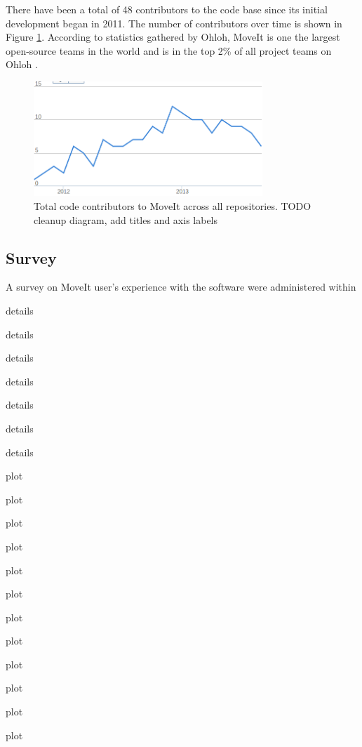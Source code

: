 \documentclass[10pt,journal,compsoc]{joser1}
\begin{document}
{There have been a total of 48 contributors to the code base since its initial development began in 2011. The number of contributors over time is shown in Figure \ref{fig:contributors}. According to statistics gathered by Ohloh, MoveIt is one the largest open-source teams in the world and is in the top 2\% of all project teams on Ohloh \cite{ohloh}.

\begin{figure}[!t]
\centering
\includegraphics[width=3.4in]{images/contributors}
\caption{Total code contributors to MoveIt across all repositories. TODO cleanup diagram, add titles and axis labels}
\label{fig:contributors}
\end{figure}


\subsection{Survey}
\label{sec::survey}

A survey on MoveIt user's experience with the software were administered within

details

details

details

details

details

details

details

plot 

plot 

plot 

plot 

plot 

plot 

plot 

plot 

plot 

plot 

plot 

plot 

}
\end{document}
